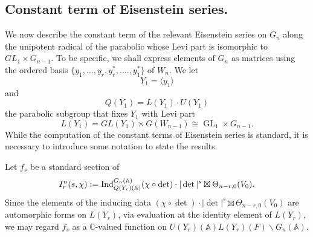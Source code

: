 \documentclass[10pt]{amsart}
\theoremstyle{plain}
\numberwithin{equation}{section}
\begin{document}
 \vskip 5pt
 
 \subsection{\bf Constant term of Eisenstein series.}
 We now describe the constant term of the relevant  Eisenstein series on 
 $G_n$ along the unipotent radical of the parabolic whose Levi part is
 isomorphic to $GL_1\times G_{n-1}$. To be specific, we shall express
 elements of $G_n$ as matrices using the ordered basis $\{
 y_1,...,y_r, y_r^*, ...., y_1^*\}$ of $W_n$. We let
\[
Y_1=\langle y_1\rangle
\]
and 
\[
Q(Y_1)=L(Y_1)\cdot U(Y_1)
\]
 the parabolic subgroup that fixes $Y_1$ with Levi part
\[
L(Y_1)=GL(Y_1)\times G(W_{n-1})\cong{\operatorname{GL}}_1 \times G_{n-1}.
\]
While the computation of the constant terms of Eisenstein series is
standard, it is necessary to introduce some notation to state the
results. 
\vskip 5pt

 Let $f_s$ be a standard section of
\begin{equation}\label{E:non-Siegel-principal}
I^n_r(s, \chi) : = {\rm Ind}_{Q(Y_r)({\mathbb{A}})}^{G_n({\mathbb{A}})} (\chi\circ \det) \cdot |\det|^s \boxtimes 
 \Theta_{n-r,0}(V_0).
\end{equation}
Since the elements of the inducing data $(\chi \circ \det) \cdot
|\det|^s \boxtimes  \Theta_{n-r,0}(V_0)$ are automorphic forms on
$L(Y_r)$, via evaluation at the identity element of $L(Y_r)$, we may
regard $f_s$ as a ${\mathbb C}$-valued function on $U(Y_r)({\mathbb{A}}) L(Y_r)(F)
\backslash G_n({\mathbb{A}})$. 
 \vskip 5pt
\end{document}
